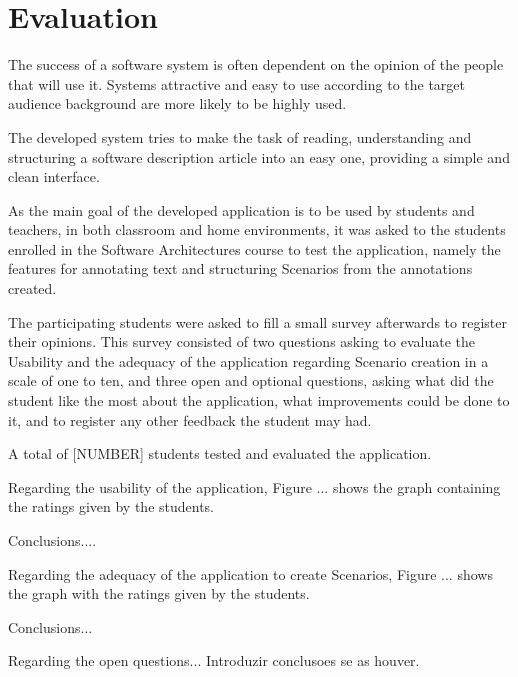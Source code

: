 
\chapter{Evaluation}
\label{chapter:evaluation}

The success of a software system is often dependent on the opinion of the people that will use it. Systems attractive and easy to use according to the target audience background are more likely to be highly used.

The developed system tries to make the task of reading, understanding and structuring a software description article into an easy one, providing a simple and clean interface.

As the main goal of the developed application is to be used by students and teachers, in both classroom and home environments, it was asked to the students enrolled in the Software Architectures course to test the application, namely the features for annotating text and structuring Scenarios from the annotations created.

The participating students were asked to fill a small survey afterwards to register their opinions.
This survey consisted of two questions asking to evaluate the Usability and the adequacy of the application regarding Scenario creation in a scale of one to ten, and three open and optional questions, asking what did the student like the most about the application, what improvements could be done to it, and to register any other feedback the student may had.

A total of [NUMBER] students tested and evaluated the application. 

Regarding the usability of the application, Figure ... shows the graph containing the ratings given by the students.

Conclusions....

Regarding the adequacy of the application to create Scenarios, Figure ... shows the graph with the ratings given by the students.

Conclusions...
\begin{figure}
\centering
{}
\end{figure}

Regarding the open questions... Introduzir conclusoes se as houver.
 

